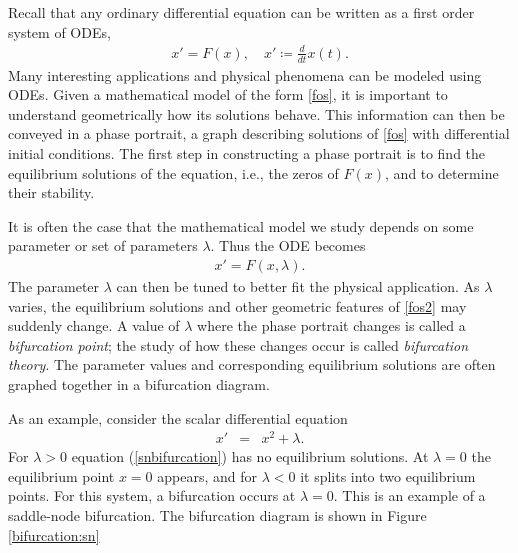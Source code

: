\label{lab:Bifurcations}

Recall that any ordinary differential equation can be written as a first order system of ODEs,
\begin{align}
x' = F(x), \quad x' \coloneq \frac{d}{dt}x(t).\label{fos}
\end{align}
Many interesting applications and physical phenomena can be modeled using ODEs.
Given a mathematical model of the form \eqref{fos}, it is important to understand geometrically how its solutions behave.
This information can then be conveyed in a phase portrait, a graph describing solutions of \eqref{fos} with differential initial conditions.
The first step in constructing a phase portrait is to find the equilibrium solutions of the equation, i.e., the zeros of $F(x)$, and to determine their stability.

It is often the case that the mathematical model we study depends on some parameter or set of parameters $\lambda$.
Thus the ODE becomes
\begin{align}
x' = F(x,\lambda).\label{fos2}
\end{align}
The parameter $\lambda$ can then be tuned to better fit the physical application.
As $\lambda$ varies, the equilibrium solutions and other geometric features of \eqref{fos2} may suddenly change.
A value of $\lambda$ where the phase portrait changes is called a \emph{bifurcation point}; the study of how these changes occur is called \emph{bifurcation theory}.
The parameter values and corresponding equilibrium solutions are often graphed together in a bifurcation diagram.

As an example, consider the scalar differential equation
\begin{eqnarray}
x' &=& x^2 + \lambda. \label{snbifurcation}
\end{eqnarray}
For $\lambda > 0$ equation (\ref{snbifurcation}) has no equilibrium solutions.
At $\lambda = 0$ the equilibrium point $x=0$ appears, and for $\lambda < 0$ it splits into two equilibrium points.
For this system, a bifurcation occurs at $\lambda = 0$.
This is an example of a saddle-node bifurcation.
The bifurcation diagram is shown in Figure \ref{bifurcation:sn}

